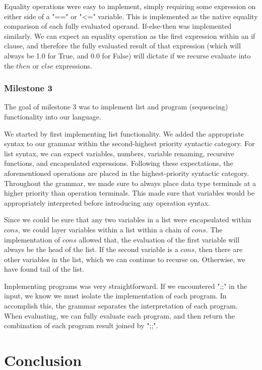 \documentclass{article}
\theoremstyle{theorem}
\theoremstyle{definition}
\theoremstyle{remark}
\begin{document}
Equality operations were easy to implement, simply requiring some expression on either side of a "==" or "<=" variable. This is implemented as the native equality comparison of each fully evaluated operand. If-else-then was implemented similarly. We can expect an equality operation as the first expression within an if clause, and therefore the fully evaluated result of that expression (which will always be 1.0 for True, and 0.0 for False) will dictate if we recurse evaluate into the $then$ or $else$ expressions.

\subsubsection{Milestone 3}

The goal of milestone 3 was to implement list and program (sequencing) functionality into our language.

We started by first implementing list functionality. We added the appropriate syntax to our grammar within the second-highest priority syntactic category. For list syntax, we can expect variables, numbers, variable renaming, recursive functions, and encapsulated expressions. Following these expectations, the aforementioned operations are placed in the highest-priority syntactic category. Throughout the grammar, we made sure to always place data type terminals at a higher priority than operation terminals. This made sure that variables would be appropriately interpreted before introducing any operation syntax.

Since we could be sure that any two variables in a list were encapsulated within $cons$, we could layer variables within a list within a chain of $cons$. The implementation of $cons$ allowed that, the evaluation of the first variable will always be the head of the list. If the second variable is a $cons$, then there are other variables in the list, which we can continue to recurse on. Otherwise, we have found tail of the list.

Implementing programs was very straightforward. If we encountered ";;" in the input, we know we must isolate the implementation of each program. In accomplish this, the grammar separates the interpretation of each program. When evaluating, we can fully evaluate each program, and then return the combination of each program result joined by ";;".

\section{Conclusion}\label{conclusion}
\end{document}
